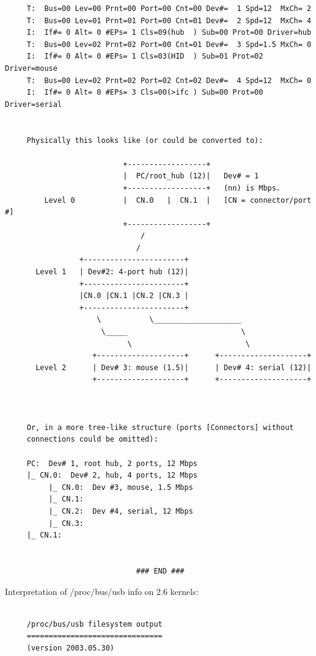 {{{{{{{{{{{{{{{{{\begin{verbatim}
     T:  Bus=00 Lev=00 Prnt=00 Port=00 Cnt=00 Dev#=  1 Spd=12  MxCh= 2
     T:  Bus=00 Lev=01 Prnt=01 Port=00 Cnt=01 Dev#=  2 Spd=12  MxCh= 4
     I:  If#= 0 Alt= 0 #EPs= 1 Cls=09(hub  ) Sub=00 Prot=00 Driver=hub
     T:  Bus=00 Lev=02 Prnt=02 Port=00 Cnt=01 Dev#=  3 Spd=1.5 MxCh= 0
     I:  If#= 0 Alt= 0 #EPs= 1 Cls=03(HID  ) Sub=01 Prot=02 Driver=mouse
     T:  Bus=00 Lev=02 Prnt=02 Port=02 Cnt=02 Dev#=  4 Spd=12  MxCh= 0
     I:  If#= 0 Alt= 0 #EPs= 3 Cls=00(>ifc ) Sub=00 Prot=00 Driver=serial
     
     
     Physically this looks like (or could be converted to):
     
                           +------------------+
                           |  PC/root_hub (12)|   Dev# = 1
                           +------------------+   (nn) is Mbps.
         Level 0           |  CN.0   |  CN.1  |   [CN = connector/port #]
                           +------------------+
                               /
                              /
                 +-----------------------+
       Level 1   | Dev#2: 4-port hub (12)|
                 +-----------------------+
                 |CN.0 |CN.1 |CN.2 |CN.3 |
                 +-----------------------+
                     \           \____________________
                      \_____                          \
                            \                          \
                    +--------------------+      +--------------------+
       Level 2      | Dev# 3: mouse (1.5)|      | Dev# 4: serial (12)|
                    +--------------------+      +--------------------+
     
     
     
     Or, in a more tree-like structure (ports [Connectors] without
     connections could be omitted):
     
     PC:  Dev# 1, root hub, 2 ports, 12 Mbps
     |_ CN.0:  Dev# 2, hub, 4 ports, 12 Mbps
          |_ CN.0:  Dev #3, mouse, 1.5 Mbps
          |_ CN.1:
          |_ CN.2:  Dev #4, serial, 12 Mbps
          |_ CN.3:
     |_ CN.1:
     
     
                              ### END ###
\end{verbatim}
\normalsize

Interpretation of /proc/bus/usb info on 2.6 kernels: 

\footnotesize
\begin{verbatim}
     
     /proc/bus/usb filesystem output
     ===============================
     (version 2003.05.30)
     

\end{verbatim}}}}}}}}}}}}}}}}}}
